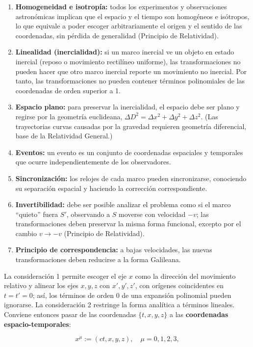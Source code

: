 \begin{enumerate}
    \item \textbf{Homogeneidad e isotropía:} todos los experimentos y observaciones astronómicas implican que el espacio y el tiempo son homogéneos e isótropos, lo que equivale a poder escoger arbitrariamente el origen y el sentido de las coordenadas, sin pérdida de generalidad (Principio de Relatividad).
    \item \textbf{Linealidad (inercialidad):} si un marco inercial ve un objeto en estado inercial (reposo o movimiento rectilíneo uniforme), las transformaciones no pueden hacer que otro marco inercial reporte un movimiento no inercial. Por tanto, las transformaciones no pueden contener términos polinomiales de las coordenadas de orden superior a 1.
    \item \textbf{Espacio plano:} para preservar la inercialidad, el espacio debe ser plano y regirse por la geometría euclideana, $\Delta D^2 = \Delta x^2 + \Delta y^2 + \Delta z^2$. (Las trayectorias curvas causadas por la gravedad requieren geometría diferencial, base de la Relatividad General.)
    \item \textbf{Eventos:} un evento es un conjunto de coordenadas espaciales y temporales que ocurre independientemente de los observadores.
    \item \textbf{Sincronización:} los relojes de cada marco pueden sincronizarse, conociendo su separación espacial y haciendo la corrección correspondiente.
    \item \textbf{Invertibilidad:} debe ser posible analizar el problema como si el marco ``quieto'' fuera $S'$, observando a $S$ moverse con velocidad $-v$; las transformaciones deben preservar la misma forma funcional, excepto por el cambio $v \to -v$ (Principio de Relatividad).
    \item \textbf{Principio de correspondencia:} a bajas velocidades, las nuevas transformaciones deben reducirse a la forma Galileana.
\end{enumerate}

La consideración 1 permite escoger el eje $x$ como la dirección del movimiento relativo y alinear los ejes $x, y, z$ con $x', y', z'$, con orígenes coincidentes en $t = t' = 0$; así, los términos de orden 0 de una expansión polinomial pueden ignorarse. La consideración 2 restringe la forma analítica a términos lineales. Conviene entonces pasar de las coordenadas $\{t, x, y, z\}$ a las \textbf{coordenadas espacio-temporales}:

$$x^{\mu} := (ct, x, y, z), \quad \mu = 0, 1, 2, 3,$$

